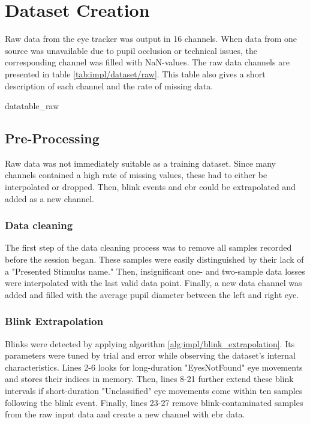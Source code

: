 \section{Dataset Creation} \label{sec:impl/dataset}

Raw data from the eye tracker was output in 16 channels. 
When data from one source was unavailable due to pupil occlusion or technical issues, the corresponding channel was filled with NaN-values. The raw data channels are presented in table \ref{tab:impl/dataset/raw}. This table also gives a short description of each channel and the rate of missing data.

{datatable_raw}

\subsection{Pre-Processing}

Raw data was not immediately suitable as a training dataset. Since many channels contained a high rate of missing values, these had to either be interpolated or dropped. Then, blink events and \acrshort{ebr} could be extrapolated and added as a new channel.

\newpage
\subsubsection{Data cleaning}

The first step of the data cleaning process was to remove all samples recorded before the session began. These samples were easily distinguished by their lack of a "Presented Stimulus name." Then, insignificant one- and two-sample data losses were interpolated with the last valid data point. Finally, a new data channel was added and filled with the average pupil diameter between the left and right eye. 

\subsubsection{Blink Extrapolation}

Blinks were detected by applying algorithm \ref{alg:impl/blink_extrapolation}. Its parameters were tuned by trial and error while observing the dataset's internal characteristics. Lines 2-6 looks for long-duration "EyesNotFound" eye movements and stores their indices in memory. Then, lines 8-21 further extend these blink intervals if short-duration "Unclassified" eye movements come within ten samples following the blink event. Finally, lines 23-27 remove blink-contaminated samples from the raw input data and create a new channel with \acrshort{ebr} data.

